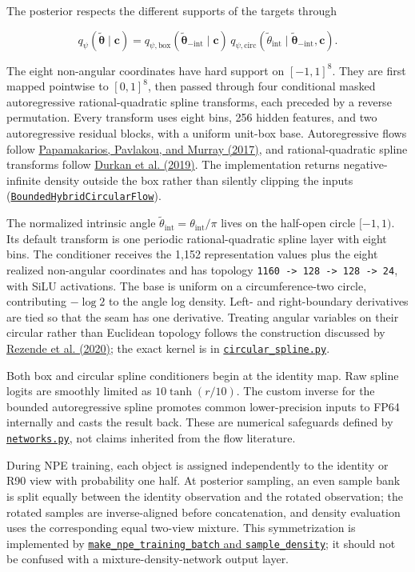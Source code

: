 \documentclass[11pt]{article}
\newcommand{\code}[1]{\nolinkurl{#1}}
\begin{document}
The posterior respects the different supports of the targets through

\[
q_\psi(\widetilde{\bm\theta}\mid\mathbf c)=
q_{\psi,\mathrm{box}}(\widetilde{\bm\theta}_{-\mathrm{int}}\mid\mathbf c)\,
q_{\psi,\mathrm{circ}}(\widetilde\theta_\mathrm{int}\mid
\widetilde{\bm\theta}_{-\mathrm{int}},\mathbf c).
\]

The eight non-angular coordinates have hard support on \([-1,1]^8\). They are
first mapped pointwise to \([0,1]^8\), then passed through four conditional
masked autoregressive rational-quadratic spline transforms, each preceded by a
reverse permutation. Every transform uses eight bins, 256 hidden features, and
two autoregressive residual blocks, with a uniform unit-box base. Autoregressive
flows follow \hyperlink{ref:papamakarios2017}{Papamakarios, Pavlakou, and Murray (2017)}, and
rational-quadratic spline transforms follow \hyperlink{ref:durkan2019}{Durkan et al. (2019)}.
The implementation returns negative-infinite density outside the box rather
than silently clipping the inputs
(\href{../arch/networks.py}{\code{BoundedHybridCircularFlow}}).

The normalized intrinsic angle \(\widetilde\theta_\mathrm{int}=\theta_\mathrm{int}/\pi\) lives on the
half-open circle \([-1,1)\). Its default transform is one periodic rational-quadratic spline layer with eight bins. The conditioner receives the 1,152 representation values plus the eight realized non-angular coordinates and has topology \code{1160 -> 128 -> 128 -> 24}, with SiLU activations. The base is uniform on a circumference-two circle, contributing \(-\log 2\) to the angle log density. Left- and right-boundary derivatives are tied so that the seam has one derivative. Treating angular variables on their circular rather than Euclidean topology follows the construction discussed by \hyperlink{ref:rezende2020}{Rezende et al. (2020)}; the exact kernel is in
\href{../arch/circular_spline.py}{\code{circular_spline.py}}.

Both box and circular spline conditioners begin at the identity map. Raw
spline logits are smoothly limited as \(10\tanh(r/10)\). The custom inverse
for the bounded autoregressive spline promotes common lower-precision inputs
to FP64 internally and casts the result back. These are numerical safeguards
defined by \href{../arch/networks.py}{\code{networks.py}}, not claims inherited from the
flow literature.

During NPE training, each object is assigned independently to the identity or
R90 view with probability one half. At posterior sampling, an even sample bank
is split equally between the identity observation and the rotated observation;
the rotated samples are inverse-aligned before concatenation, and density
evaluation uses the corresponding equal two-view mixture. This symmetrization
is implemented by \href{../arch/train.py}{\code{make_npe_training_batch} and \code{sample_density}}; it should not be confused with a
mixture-density-network output layer.
\end{document}
